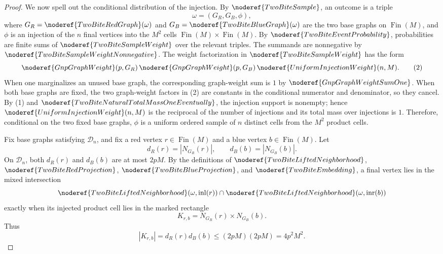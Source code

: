 \begin{proof}
We now spell out the conditional distribution of the injection.  By
\(\noderef{TwoBiteSample}\), an outcome is a triple
\[
\omega=(G_R,G_B,\phi),
\]
where \(G_R=\noderef{TwoBiteRedGraph}(\omega)\) and
\(G_B=\noderef{TwoBiteBlueGraph}(\omega)\) are the two base graphs on
\(\operatorname{Fin}(M)\), and \(\phi\) is an injection of the \(n\) final
vertices into the \(M^2\) cells
\(\operatorname{Fin}(M)\times\operatorname{Fin}(M)\).  By
\(\noderef{TwoBiteEventProbability}\), probabilities are finite sums of
\(\noderef{TwoBiteSampleWeight}\) over the relevant triples.  The summands
are nonnegative by \(\noderef{TwoBiteSampleWeightNonnegative}\).  The weight
factorization in \(\noderef{TwoBiteSampleWeight}\) has the form
\[
\noderef{GnpGraphWeight}(p,G_R)\,
\noderef{GnpGraphWeight}(p,G_B)\,
\noderef{UniformInjectionWeight}(n,M).
\tag{2}
\]
When one marginalizes an unused base graph, the corresponding graph-weight
sum is \(1\) by \(\noderef{GnpGraphWeightSumOne}\).  When both base graphs
are fixed, the two graph-weight factors in (2) are constants in the
conditional numerator and denominator, so they cancel.  By (1) and
\(\noderef{TwoBiteNaturalTotalMassOneEventually}\), the injection support is
nonempty; hence \(\noderef{UniformInjectionWeight}(n,M)\) is the reciprocal
of the number of injections and its total mass over injections is \(1\).
Therefore, conditional on the two fixed base graphs, \(\phi\) is a uniform
ordered sample of \(n\) distinct cells from the \(M^2\) product cells.

Fix base graphs satisfying \(\mathcal D_n\), and fix a red vertex
\(r\in\operatorname{Fin}(M)\) and a blue vertex \(b\in\operatorname{Fin}(M)\).
Let
\[
d_R(r)=|N_{G_R}(r)|,\qquad d_B(b)=|N_{G_B}(b)|.
\]
On \(\mathcal D_n\), both \(d_R(r)\) and \(d_B(b)\) are at most \(2pM\).
By the definitions of \(\noderef{TwoBiteLiftedNeighborhood}\),
\(\noderef{TwoBiteRedProjection}\), \(\noderef{TwoBiteBlueProjection}\), and
\(\noderef{TwoBiteEmbedding}\), a final vertex lies in the mixed intersection
\[
\noderef{TwoBiteLiftedNeighborhood}(\omega,\operatorname{inl}(r))
\cap
\noderef{TwoBiteLiftedNeighborhood}(\omega,\operatorname{inr}(b))
\]
exactly when its injected product cell lies in the marked rectangle
\[
K_{r,b}=N_{G_R}(r)\times N_{G_B}(b).
\]
Thus
\[
|K_{r,b}|=d_R(r)d_B(b)\le (2pM)(2pM)=4p^2M^2.
\tag{3}
\]


\end{proof}
